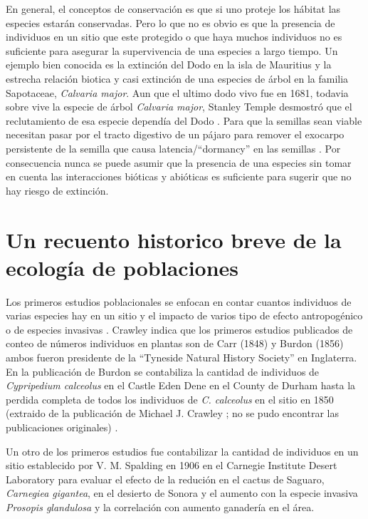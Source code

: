 \documentclass[
]{book}
\theoremstyle{definition}
\theoremstyle{definition}
\theoremstyle{definition}
\theoremstyle{definition}
\theoremstyle{remark}
\begin{document}
En general, el conceptos de conservación es que si uno proteje los hábitat las especies estarán conservadas. Pero lo que no es obvio es que la presencia de individuos en un sitio que este protegido o que haya muchos individuos no es suficiente para asegurar la supervivencia de una especies a largo tiempo. Un ejemplo bien conocida es la extinción del Dodo en la isla de Mauritius y la estrecha relación biotica y casi extinción de una especies de árbol en la familia Sapotaceae, \emph{Calvaria major}. Aun que el ultimo dodo vivo fue en 1681, todavia sobre vive la especie de árbol \emph{Calvaria major}, Stanley Temple desmostró que el reclutamiento de esa especie dependía del Dodo \citep{temple1977plant}. Para que la semillas sean viable necesitan pasar por el tracto digestivo de un pájaro para remover el exocarpo persistente de la semilla que causa latencia/``dormancy'' en las semillas \citep{temple1977plant}. Por consecuencia nunca se puede asumir que la presencia de una especies sin tomar en cuenta las interacciones bióticas y abióticas es suficiente para sugerir que no hay riesgo de extinción.

\section{Un recuento historico breve de la ecología de poblaciones}\label{un-recuento-historico-breve-de-la-ecologuxeda-de-poblaciones}

Los primeros estudios poblacionales se enfocan en contar cuantos individuos de varias especies hay en un sitio y el impacto de varios tipo de efecto antropogénico o de especies invasivas \citep{crawley1990population}. Crawley \citep{crawley1990population} indica que los primeros estudios publicados de conteo de números individuos en plantas son de Carr (1848) y Burdon (1856) ambos fueron presidente de la ``Tyneside Natural History Society'' en Inglaterra. En la publicación de Burdon se contabiliza la cantidad de individuos de \emph{Cypripedium calceolus} en el Castle Eden Dene en el County de Durham hasta la perdida completa de todos los individuos de \emph{C. calceolus} en el sitio en 1850 (extraido de la publicación de Michael J. Crawley \citep{crawley1990population}; no se pudo encontrar las publicaciones originales) .

Un otro de los primeros estudios fue contabilizar la cantidad de individuos en un sitio establecido por V. M. Spalding en 1906 en el Carnegie Institute Desert Laboratory para evaluar el efecto de la redución en el cactus de Saguaro, \emph{Carnegiea gigantea}, en el desierto de Sonora y el aumento con la especie invasiva \emph{Prosopis glandulosa} y la correlación con aumento ganadería en el área.
\end{document}

